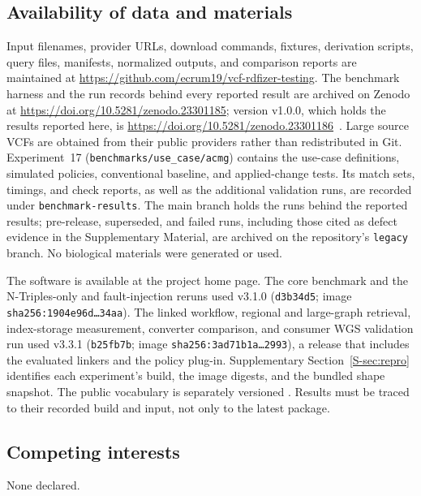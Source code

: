 \documentclass[pdflatex,sn-mathphys-num]{sn-jnl}
\begin{document}
\subsection*{Availability of data and materials}
Input filenames, provider URLs, download commands, fixtures, derivation scripts, query files, manifests, normalized outputs, and comparison reports are maintained at \url{https://github.com/ecrum19/vcf-rdfizer-testing}.
The benchmark harness and the run records behind every reported result are archived on Zenodo at \url{https://doi.org/10.5281/zenodo.23301185}; version v1.0.0, which holds the results reported here, is \url{https://doi.org/10.5281/zenodo.23301186}~\cite{vcfrdfizer_testing_zenodo}.
Large source VCFs are obtained from their public providers rather than redistributed in Git.
Experiment~17 (\texttt{benchmarks/use\_case/acmg}) contains the use-case definitions, simulated policies, conventional baseline, and applied-change tests.
Its match sets, timings, and check reports, as well as the additional validation runs, are recorded under \texttt{benchmark-results}.
The main branch holds the runs behind the reported results; pre-release, superseded, and failed runs, including those cited as defect evidence in the Supplementary Material, are archived on the repository's \texttt{legacy} branch.
No biological materials were generated or used.

The software is available at the project home page.
The core benchmark and the N-Triples-only and fault-injection reruns used v3.1.0 (\texttt{d3b34d5}; image \texttt{sha256:1904e96d\ldots34aa}).
The linked workflow, regional and large-graph retrieval, index-storage measurement, converter comparison, and consumer WGS validation run used v3.3.1 (\texttt{b25fb7b}; image \texttt{sha256:3ad71b1a\ldots2993}), a release that includes the evaluated linkers and the policy plug-in.
Supplementary Section~\ref{S-sec:repro} identifies each experiment's build, the image digests, and the bundled shape snapshot.
The public vocabulary is separately versioned \cite{vcfc210}.
Results must be traced to their recorded build and input, not only to the latest package.

\subsection*{Competing interests}
None declared.

\end{document}
